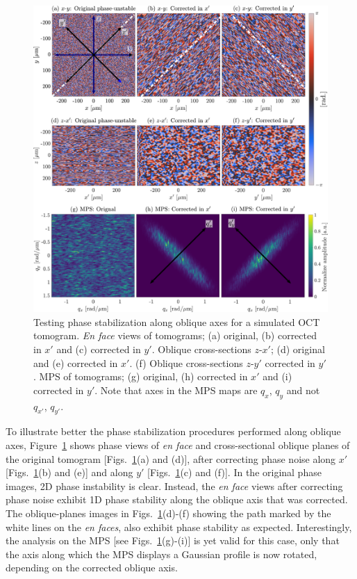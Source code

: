 \begin{figure}[b!]
	\centering
	\includegraphics[width=\textwidth]{Figures/SHARP/SHARP45d_phase.pdf}
	\caption[Testing phase stabilization along oblique axes for a simulated OCT tomogram.]{Testing phase stabilization along oblique axes for a simulated OCT tomogram. \textit{En face} views of tomograms; (a) original, (b) corrected in $x'$ and (c) corrected in $y'$. Oblique cross-sections $z$-$x'$; (d) original and (e) corrected in $x'$. (f) Oblique cross-sections $z$-$y'$ corrected in $y'$. MPS of tomograms; (g) original, (h) corrected in $x'$ and (i) corrected in $y'$. Note that axes in the MPS maps are $q_x$, $q_y$ and not $q_{x'}$, $q_{y'}$.}
	\label{fig:SHARP45d_Phase}
\end{figure}

To illustrate better the phase stabilization procedures performed along oblique axes, Figure~\ref{fig:SHARP45d_Phase} shows phase views of \textit{en face} and cross-sectional oblique planes of the original tomogram [Figs.~\ref{fig:SHARP45d_Phase}(a) and (d)], after correcting phase noise along $x'$ [Figs.~\ref{fig:SHARP45d_Phase}(b) and (e)] and along $y'$ [Figs.~\ref{fig:SHARP45d_Phase}(c) and (f)]. In the original phase images, 2D phase instability is clear. Instead, the \textit{en face} views after correcting phase noise exhibit 1D phase stability along the oblique axis that was corrected. The oblique-planes images in Figs.~\ref{fig:SHARP45d_Phase}(d)-(f) showing the path marked by the white lines on the \textit{en faces}, also exhibit phase stability as expected. Interestingly, the analysis on the MPS [see Figs.~\ref{fig:SHARP45d_Phase}(g)-(i)] is yet valid for this case, only that the axis along which the MPS displays a Gaussian profile is now rotated, depending on the corrected oblique axis.


